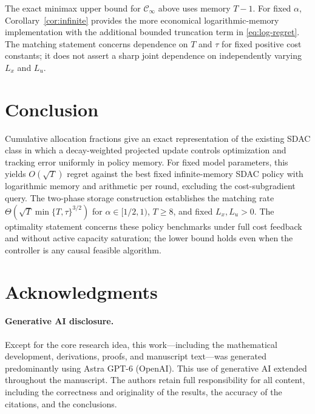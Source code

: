 \documentclass[11pt]{article}
\newcommand{\CI}{\mathcal C_\infty}
\begin{document}
The exact minimax upper bound for $\CI$ above uses memory $T-1$.
For fixed $\alpha$, Corollary~\ref{cor:infinite} provides the
more economical logarithmic-memory implementation with the
additional bounded truncation term in \eqref{eq:log-regret}.
The matching statement concerns dependence on $T$ and $\tau$
for fixed positive cost constants; it does not assert a sharp
joint dependence on independently varying $L_x$ and $L_u$.

\section{Conclusion}

Cumulative allocation fractions give an exact representation of
the existing SDAC class in which a decay-weighted projected update
controls optimization and tracking error uniformly in policy memory.
For fixed model parameters, this yields $O(\sqrt T)$ regret against
the best fixed infinite-memory SDAC policy with logarithmic memory
and arithmetic per round, excluding the cost-subgradient query.
The two-phase storage construction establishes the matching
rate $\Theta(\sqrt T\min\{T,\tau\}^{3/2})$ for
$\alpha\in[1/2,1)$, $T\ge8$, and fixed $L_x,L_u>0$.
The optimality statement concerns these policy benchmarks under
full cost feedback and without active capacity saturation; the
lower bound holds even when the controller is any causal feasible
algorithm.

\section*{Acknowledgments}

\paragraph{Generative AI disclosure.}
Except for the core research idea, this work---including the mathematical
development, derivations, proofs, and manuscript text---was generated
predominantly using Astra GPT-6 (OpenAI). This use of generative AI
extended throughout the manuscript. The authors retain full responsibility
for all content, including the correctness and originality of the results,
the accuracy of the citations, and the conclusions.



\end{document}
